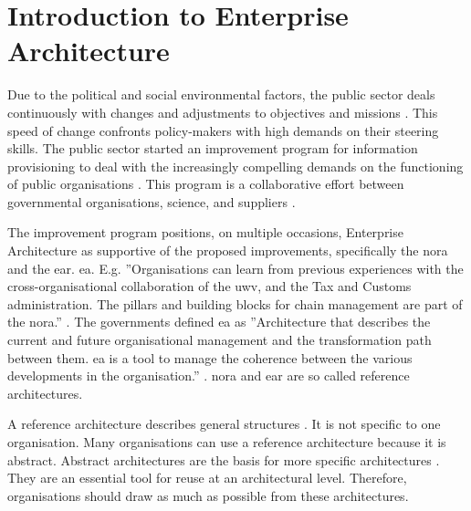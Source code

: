 \section{Introduction to Enterprise Architecture}
\label{sec:introea}
Due to the political and social environmental factors, the public sector deals continuously with changes and adjustments to objectives and missions \parencite{Nijssen2018}. This speed of change confronts policy-makers with high demands on their steering skills. The public sector started an improvement program for information provisioning \parencite{Digitaleoverheid2021} to deal with the increasingly compelling demands on the functioning of public organisations \parencite[p.~13]{Eck2009}. This program is a collaborative effort between governmental organisations, science, and suppliers \parencite[p.~128]{Digitaleoverheid2021}.

The improvement program positions, on multiple occasions, Enterprise Architecture as supportive of the proposed improvements, specifically the \acrfull{nora} and the \acrfull{ear}. \gls{ea}. E.g. ''Organisations can learn from previous experiences with the cross-organisational collaboration of the \acrlong{uwv}, and the Tax and Customs administration. The pillars and building blocks for chain management are part of the \acrshort{nora}.'' \parencite[p.~40]{Digitaleoverheid2021}. The governments defined \gls{ea} as ''Architecture that describes the current and future organisational management and the transformation path between them. \gls{ea} is a tool to manage the coherence between the various developments in the organisation.'' \parencite{NoraEA}. \acrshort{nora} and \acrshort{ear} are so called reference architectures.

A reference architecture describes general structures \parencite[p.~8]{Greefhorst2008}. It is not specific to one organisation. Many organisations can use a reference architecture because it is abstract. Abstract architectures are the basis for more specific architectures \parencite[p.~11]{Greefhorst2008}. They are an essential tool for reuse at an architectural level. Therefore, organisations should draw as much as possible from these architectures.


